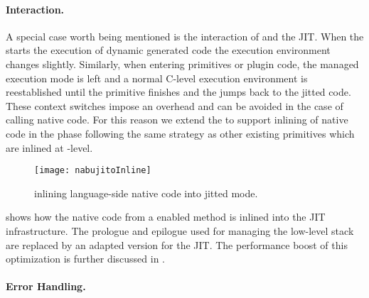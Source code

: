 \paragraph{\JIT Interaction.}

A special case worth being mentioned is the interaction of \B and the JIT.
When the \PH \VM starts the execution of dynamic generated code the execution environment changes slightly.
Similarly, when entering primitives or plugin code, the managed execution mode is left and a normal C-level execution environment is reestablished until the primitive finishes and the \VM jumps back to the jitted code.
These context switches impose an overhead and can be avoided in the case of calling native code.
For this reason we extend the \VM to support inlining of native code in the \JIT phase following the same strategy as other existing primitives which are inlined at \JIT-level.
%
\begin{figure}[ht]
	\centering
	\texttt{[image: nabujitoInline]}
	\caption[\B \JIT Interaction]{\B inlining language-side native code into jitted mode.}
\end{figure}
%
 shows how the native code from a \B enabled method is inlined into the JIT infrastructure.
The \B prologue and epilogue used for managing the low-level stack are replaced by an adapted version for the JIT.
The performance boost of this optimization is further discussed in .


\paragraph{Error Handling.}

